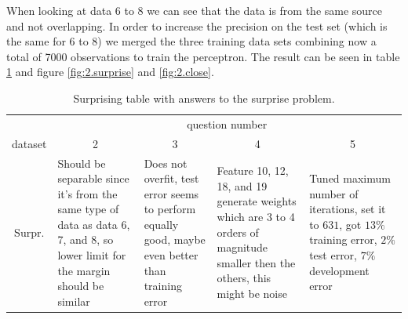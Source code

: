 \documentclass[12pt]{article}
\begin{document}
\noindent

When looking at data 6 to 8 we can see that the data is from the same source and not overlapping. In order to increase the precision on the test set (which is the same for 6 to 8) we merged the three training data sets combining now a total of 7000 observations to train the perceptron. The result can be seen in table \ref{tab:3} and figure \ref{fig:2.surprise} and \ref{fig:2.close}.

\begin{table}[h!]
	\centering
	\begin{tabularx}{\textwidth}{c|X|X|X|X|}
		& \multicolumn{4}{c|}{question number} \\
		dataset & \multicolumn{1}{c}{2} & \multicolumn{1}{c}{3} & \multicolumn{1}{c}{4} & \multicolumn{1}{c|}{5} \\
		\midrule
		Surpr.     &   Should be separable since it's from the same type of data as data 6, 7, and 8, so lower limit for the margin should be similar   &  Does not overfit, test error seems to perform equally good, maybe even better than training error      &   Feature 10, 12, 18, and 19 generate weights which are 3 to 4 orders of magnitude smaller then the others, this might be noise  & Tuned maximum number of iterations, set it to $631$, got $13\%$ training error, $2\%$ test error, $7\%$ development error \\
		\midrule
		\bottomrule
	\end{tabularx}%
	\caption{Surprising table with answers to the surprise problem.}
	\label{tab:3}%
\end{table}%
\end{document}
